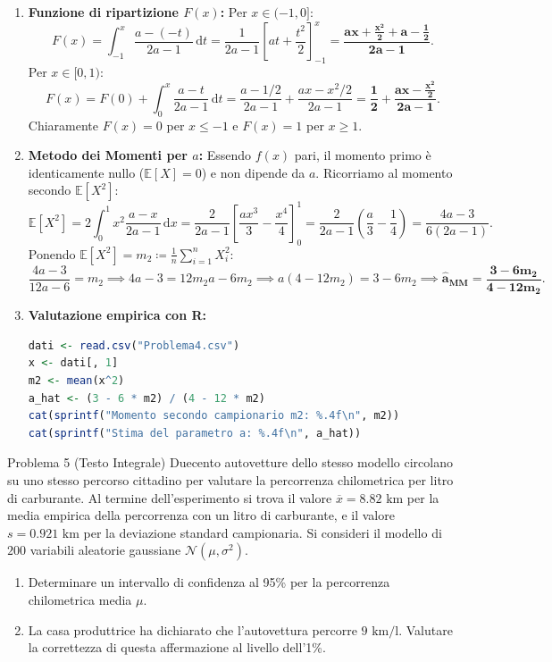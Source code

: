 \documentclass[11pt,a4paper]{article}
\newcommand{\EE}{\mathbb{E}}
\newcommand{\dx}{\mathrm{d}x}
\begin{document}
\begin{soluzionebox}
\begin{enumerate}
    \item \textbf{Funzione di ripartizione $F(x)$:}
    Per $x \in (-1, 0]$:
    \[
    F(x) = \int_{-1}^x \frac{a - (-t)}{2a-1} \, \mathrm{d}t = \frac{1}{2a-1} \left[ at + \frac{t^2}{2} \right]_{-1}^x = \mathbf{\frac{ax + \frac{x^2}{2} + a - \frac{1}{2}}{2a-1}}.
    \]
    Per $x \in [0, 1)$:
    \[
    F(x) = F(0) + \int_0^x \frac{a - t}{2a-1} \, \mathrm{d}t = \frac{a - 1/2}{2a-1} + \frac{ax - x^2/2}{2a-1} = \mathbf{\frac{1}{2} + \frac{ax - \frac{x^2}{2}}{2a-1}}.
    \]
    Chiaramente $F(x)=0$ per $x \le -1$ e $F(x)=1$ per $x \ge 1$.

    \item \textbf{Metodo dei Momenti per $a$:}
    Essendo $f(x)$ pari, il momento primo è identicamente nullo ($\EE[X] = 0$) e non dipende da $a$.
    Ricorriamo al momento secondo $\EE[X^2]$:
    \[
    \EE[X^2] = 2 \int_0^1 x^2 \frac{a - x}{2a-1} \, \dx = \frac{2}{2a-1} \left[ \frac{a x^3}{3} - \frac{x^4}{4} \right]_0^1 = \frac{2}{2a-1} \left(\frac{a}{3} - \frac{1}{4}\right) = \frac{4a - 3}{6(2a-1)}.
    \]
    Ponendo $\EE[X^2] = m_2 \coloneqq \frac{1}{n}\sum_{i=1}^n X_i^2$:
    \[
    \frac{4a - 3}{12a - 6} = m_2 \implies 4a - 3 = 12 m_2 a - 6 m_2 \implies a(4 - 12m_2) = 3 - 6m_2 \implies \mathbf{\widehat{a}_{\text{MM}} = \frac{3 - 6m_2}{4 - 12m_2}}.
    \]

    \item \textbf{Valutazione empirica con R:}
\begin{lstlisting}[language=R]
dati <- read.csv("Problema4.csv")
x <- dati[, 1]
m2 <- mean(x^2)
a_hat <- (3 - 6 * m2) / (4 - 12 * m2)
cat(sprintf("Momento secondo campionario m2: %.4f\n", m2))
cat(sprintf("Stima del parametro a: %.4f\n", a_hat))
\end{lstlisting}
\end{enumerate}
\end{soluzionebox}

\begin{problemabox}{Problema 5 (Testo Integrale)}
Duecento autovetture dello stesso modello circolano su uno stesso percorso cittadino per valutare la percorrenza chilometrica per litro di carburante. Al termine dell'esperimento si trova il valore $\overline{x} = 8.82\text{ km}$ per la media empirica della percorrenza con un litro di carburante, e il valore $s = 0.921\text{ km}$ per la deviazione standard campionaria. Si consideri il modello di $200$ variabili aleatorie gaussiane $\mathcal{N}(\mu, \sigma^2)$.
\begin{enumerate}
    \item Determinare un intervallo di confidenza al 95\% per la percorrenza chilometrica media $\mu$.
    \item La casa produttrice ha dichiarato che l'autovettura percorre $9\text{ km/l}$. Valutare la correttezza di questa affermazione al livello dell'1\%.
\end{enumerate}
\end{problemabox}
\end{document}
